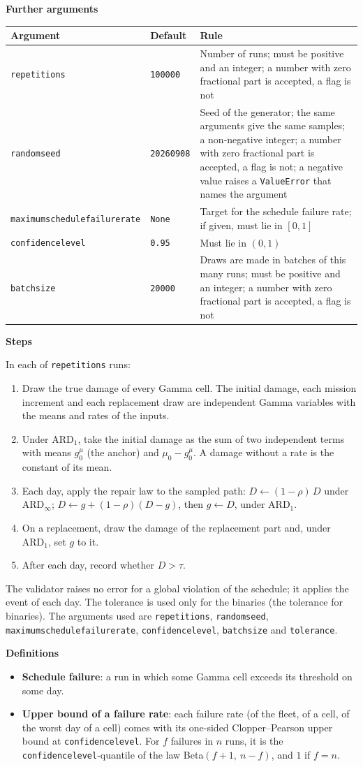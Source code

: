 \documentclass[11pt,a4paper]{article}
\makeatletter
\theoremstyle{plain}
\theoremstyle{definition}
\newcommand{\ARDinf}{\mathrm{ARD}_{\infty}}
\newcommand{\ARDone}{\mathrm{ARD}_{1}}
\newcommand{\blockhead}[1]{\par\noindent\textbf{#1}\par\nobreak}
\renewcommand{\_}{\textunderscore\allowbreak{}}
\providecommand{\typerow}[3]{{\raggedright #1\par} & {\raggedright #2\par} & {\raggedright #3\par} \\}
\providecommand{\tabstart}[2]{\begingroup\small\begin{longtable}{@{}#1@{}}\toprule #2 \\ \midrule \endhead}
\providecommand{\tabend}{\bottomrule\end{longtable}\endgroup}
\makeatother
\begin{document}
\blockhead{Further arguments}
\tabstart{p{4.3cm}p{2.3cm}p{8.2cm}}{Argument & Default & Rule}
\typerow{\texttt{repetitions}}{\texttt{100000}}{Number of runs; must be positive and an integer; a number with zero fractional part is accepted, a flag is not}
\typerow{\texttt{random\_seed}}{\texttt{20260908}}{Seed of the generator; the same arguments give the same samples; a non-negative integer; a number with zero fractional part is accepted, a flag is not; a negative value raises a \texttt{ValueError} that names the argument}
\typerow{\texttt{maximum\_schedule\_failure\_rate}}{\texttt{None}}{Target for the schedule failure rate; if given, must lie in $[0,1]$}
\typerow{\texttt{confidence\_level}}{\texttt{0.95}}{Must lie in $(0,1)$}
\typerow{\texttt{batch\_size}}{\texttt{20000}}{Draws are made in batches of this many runs; must be positive and an integer; a number with zero fractional part is accepted, a flag is not}
\tabend

\blockhead{Steps}
In each of \texttt{repetitions} runs:
\begin{enumerate}[nosep,label=\arabic*.]
  \item Draw the true damage of every Gamma cell. The initial damage, each mission increment and each replacement draw are independent Gamma variables with the means and rates of the inputs.
  \item Under $\ARDone$, take the initial damage as the sum of two independent terms with means $g^{\mu}_0$ (the anchor) and $\mu_0 - g^{\mu}_0$. A damage without a rate is the constant of its mean.
  \item Each day, apply the repair law to the sampled path: $D \leftarrow (1-\rho)\,D$ under $\ARDinf$; $D \leftarrow g + (1-\rho)(D - g)$, then $g \leftarrow D$, under $\ARDone$.
  \item On a replacement, draw the damage of the replacement part and, under $\ARDone$, set $g$ to it.
  \item After each day, record whether $D > \tau$.
\end{enumerate}
The validator raises no error for a global violation of the schedule; it applies the event of each day. The tolerance is used only for the binaries (the tolerance for binaries). The arguments used are \texttt{repetitions}, \texttt{random\_seed}, \texttt{maximum\_schedule\_failure\_rate}, \texttt{confidence\_level}, \texttt{batch\_size} and \texttt{tolerance}.

\blockhead{Definitions}
\begin{itemize}[nosep,leftmargin=1.5em]
  \item \textbf{Schedule failure}: a run in which some Gamma cell exceeds its threshold on some day.
  \item \textbf{Upper bound of a failure rate}: each failure rate (of the fleet, of a cell, of the worst day of a cell) comes with its one-sided Clopper--Pearson upper bound at \texttt{confidence\_level}. For $f$ failures in $n$ runs, it is the \texttt{confidence\_level}-quantile of the law Beta$(f+1,\ n-f)$, and $1$ if $f = n$.
\end{itemize}
\end{document}
